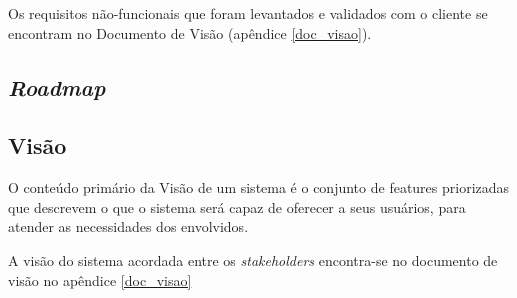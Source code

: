 	  Os requisitos não-funcionais que foram levantados e validados com o cliente se encontram no Documento
	  de Visão (apêndice \ref{doc_visao}).
      
    \subsection{\textit{Roadmap}}
    
      
    
    \subsection{Visão}
    
      O conteúdo primário da Visão de um sistema é o conjunto de features priorizadas que descrevem o que o sistema será capaz de oferecer 
      a seus usuários, para atender as necessidades dos envolvidos. \cite{leffingwell11}
      
      A visão do sistema acordada entre os \textit{stakeholders} encontra-se no documento de visão no apêndice \ref{doc_visao}
      
      \vfill
